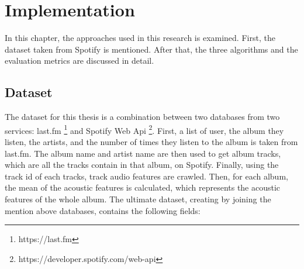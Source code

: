 \chapter{Implementation} %

\label{Chapter3} %

In this chapter, the approaches used in this research is examined. First, the dataset taken from Spotify is mentioned. After that, the three algorithms and the evaluation metrics are discussed in detail.

\section{Dataset}

The dataset for this thesis is a combination between two databases from two services: last.fm \footnote{https://last.fm} and Spotify Web Api \footnote{https://developer.spotify.com/web-api}. First, a list of user, the album they listen, the artists, and the number of times they listen to the album is taken from last.fm. The album name and artist name are then used to get album tracks, which are all the tracks contain in that album, on Spotify. Finally, using the track id of each tracks, track audio features are crawled. Then, for each album, the mean of the acoustic features is calculated, which represents the acoustic features of the whole album. The ultimate dataset, creating by joining the mention above databases, contains the following fields:

